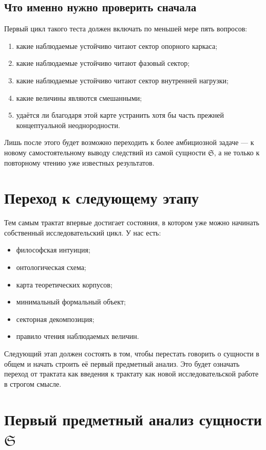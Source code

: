 \documentclass[12pt,a4paper]{article}
\begin{document}
\subsection{Что именно нужно проверить сначала}

Первый цикл такого теста должен включать по меньшей мере пять вопросов:
\begin{enumerate}
    \item какие наблюдаемые устойчиво читают сектор опорного каркаса;
    \item какие наблюдаемые устойчиво читают фазовый сектор;
    \item какие наблюдаемые устойчиво читают сектор внутренней нагрузки;
    \item какие величины являются смешанными;
    \item удаётся ли благодаря этой карте устранить хотя бы часть прежней концептуальной неоднородности.
\end{enumerate}

Лишь после этого будет возможно переходить к более амбициозной задаче --- к новому самостоятельному выводу следствий из самой сущности \(\mathfrak{S}\), а не только к повторному чтению уже известных результатов.

\section{Переход к следующему этапу}

Тем самым трактат впервые достигает состояния, в котором уже можно начинать собственный исследовательский цикл. У нас есть:
\begin{itemize}
    \item философская интуиция;
    \item онтологическая схема;
    \item карта теоретических корпусов;
    \item минимальный формальный объект;
    \item секторная декомпозиция;
    \item правило чтения наблюдаемых величин.
\end{itemize}

Следующий этап должен состоять в том, чтобы перестать говорить о сущности в общем и начать строить её первый предметный анализ. Это будет означать переход от трактата как введения к трактату как новой исследовательской работе в строгом смысле.

\section{Первый предметный анализ сущности \texorpdfstring{$\mathfrak{S}$}{S}}
\end{document}
